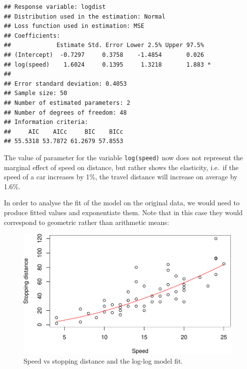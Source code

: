 \documentclass[
]{book}
\newenvironment{Shaded}{\begin{snugshade}}{\end{snugshade}}
\newcommand{\AttributeTok}[1]{\textcolor[rgb]{0.13,0.29,0.53}{#1}}
\newcommand{\FunctionTok}[1]{\textcolor[rgb]{0.13,0.29,0.53}{\textbf{#1}}}
\newcommand{\NormalTok}[1]{#1}
\newcommand{\SpecialCharTok}[1]{\textcolor[rgb]{0.81,0.36,0.00}{\textbf{#1}}}
\newcommand{\StringTok}[1]{\textcolor[rgb]{0.31,0.60,0.02}{#1}}
\theoremstyle{definition}
\theoremstyle{definition}
\theoremstyle{definition}
\theoremstyle{definition}
\theoremstyle{remark}
\begin{document}
\begin{verbatim}
## Response variable: logdist
## Distribution used in the estimation: Normal
## Loss function used in estimation: MSE
## Coefficients:
##             Estimate Std. Error Lower 2.5% Upper 97.5%  
## (Intercept)  -0.7297     0.3758    -1.4854       0.026  
## log(speed)    1.6024     0.1395     1.3218       1.883 *
## 
## Error standard deviation: 0.4053
## Sample size: 50
## Number of estimated parameters: 2
## Number of degrees of freedom: 48
## Information criteria:
##     AIC    AICc     BIC    BICc 
## 55.5318 53.7872 61.2679 57.8553
\end{verbatim}

The value of parameter for the variable \texttt{log(speed)} now does not represent the marginal effect of speed on distance, but rather shows the elasticity, i.e.~if the speed of a car increases by 1\%, the travel distance will increase on average by 1.6\%.

In order to analyse the fit of the model on the original data, we would need to produce fitted values and exponentiate them. Note that in this case they would correspond to geometric rather than arithmetic means:

\begin{Shaded}
\end{Shaded}

\begin{figure}
\centering
\includegraphics{Svetunkov---Statistics-for-Business-Analytics_files/figure-latex/speedDistanceLogExp-1.pdf}
\caption{\label{fig:speedDistanceLogExp}Speed vs stopping distance and the log-log model fit.}
\end{figure}
\end{document}
